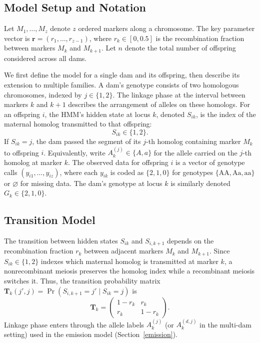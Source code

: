 \documentclass[11pt]{article}
\begin{document}
\subsection{Model Setup and Notation}
Let $M_1,\ldots,M_z$ denote $z$ ordered markers along a chromosome. The key parameter vector is $\mathbf r=(r_1,\ldots,r_{z-1})$, where $r_k\in[0,0.5]$ is the recombination fraction between markers $M_k$ and $M_{k+1}$. Let $n$ denote the total number of offspring considered across all dams.

We first define the model for a single dam and its offspring, then describe its extension to multiple families. A dam’s genotype consists of two homologous chromosomes, indexed by $j\in\{1,2\}$. The linkage phase at the interval between markers $k$ and $k+1$ describes the arrangement of alleles on these homologs. For an offspring $i$, the HMM’s hidden state at locus $k$, denoted $S_{ik}$, is the index of the maternal homolog transmitted to that offspring:
\[
S_{ik}\in\{1,2\}.
\]
If $S_{ik}=j$, the dam passed the segment of its $j$-th homolog containing marker $M_k$ to offspring $i$. Equivalently, write $A_k^{(j)}\in\{A,a\}$ for the allele carried on the $j$-th homolog at marker $k$. The observed data for offspring $i$ is a vector of genotype calls $(y_{i1},\ldots,y_{iz})$, where each $y_{ik}$ is coded as $\{2,1,0\}$ for genotypes $\{\mathrm{AA},\mathrm{Aa},\mathrm{aa}\}$ or $\varnothing$ for missing data. The dam’s genotype at locus $k$ is similarly denoted $G_k\in\{2,1,0\}$.

\subsection{Transition Model}\label{sec:transition}
The transition between hidden states $S_{ik}$ and $S_{i,k+1}$ depends on the recombination
fraction $r_k$ between adjacent markers $M_k$ and $M_{k+1}$. Since $S_{ik}\in\{1,2\}$ indexes
which maternal homolog is transmitted at marker $k$, a nonrecombinant meiosis preserves the
homolog index while a recombinant meiosis switches it. Thus, the transition probability matrix
$\mathbf T_k(j',j)=\Pr(S_{i,k+1}=j'\mid S_{ik}=j)$ is
\[
\mathbf T_k=
\begin{pmatrix}
1-r_k & r_k\\
r_k & 1-r_k
\end{pmatrix}.
\]
Linkage phase enters through the allele labels $A_k^{(j)}$ (or $A_k^{(d,j)}$ in the multi-dam setting) used in the emission model (Section~\ref{emission}).
\end{document}
